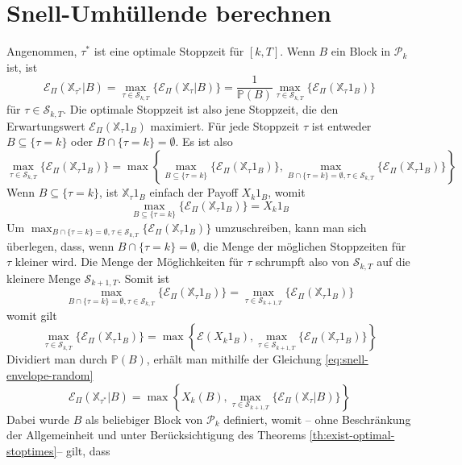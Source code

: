 \documentclass[11pt]{report} %
\begin{document}
\section{Snell-Umhüllende berechnen}
Angenommen, $\tau^*$ ist eine optimale Stoppzeit für $[k, T]$. Wenn $B$ ein Block in $\mathcal{P}_k$ ist, ist \begin{equation}\label{eq:snell-envelope-random}
    \mathcal{E}_\Pi(\mathbb{X}_{\tau^*}|B)=\max_{\tau\in\mathcal{S}_{k, T}}\{\mathcal{E}_\Pi(\mathbb{X}_\tau|B)\}=\frac{1}{\mathbb{P}(B)}\max_{\tau\in\mathcal{S}_{k, T}}\{\mathcal{E}_\Pi(\mathbb{X}_\tau1_B)\}
\end{equation} für $\tau\in\mathcal{S}_{k, T}$. Die optimale Stoppzeit ist also jene Stoppzeit, die den Erwartungswert $\mathcal{E}_\Pi(\mathbb{X}_\tau1_B)$ maximiert. Für jede Stoppzeit $\tau$ ist entweder $B\subseteq\{\tau=k\}$ oder $B\cap\{\tau=k\}=\emptyset$. Es ist also 
$$
\max_{\tau\in\mathcal{S}_{k, T}}\{\mathcal{E}_\Pi(\mathbb{X}_\tau 1_B)\} = \max \left\{ \max_{B\subseteq\{\tau = k\}} \{\mathcal{E}_\Pi(\mathbb{X}_\tau 1_B)\}, \max_{B \cap \{\tau = k\} = \emptyset, \tau \in \mathcal{S}_{k, T}} \{\mathcal{E}_\Pi(\mathbb{X}_\tau 1_B)\}\right\}
$$
Wenn $B\subseteq\{\tau=k\}$, ist $\mathbb{X}_\tau1_B$ einfach der Payoff $X_k1_B$, womit $$\max_{B\subseteq\{\tau=k\}}\{\mathcal{E}_\Pi(\mathbb{X}_\tau1_B)\}=X_k1_B$$
Um $\displaystyle \max_{B \cap \{\tau = k\} = \emptyset, \tau \in \mathcal{S}_{k, T}} \{\mathcal{E}_\Pi(\mathbb{X}_\tau 1_B)\}$ umzuschreiben, kann man sich überlegen, dass, wenn $B \cap \{\tau = k\} = \emptyset$, die Menge der möglichen Stoppzeiten für $\tau$ kleiner wird. Die Menge der Möglichkeiten für $\tau$ schrumpft also von $\mathcal{S}_{k, T}$ auf die kleinere Menge $\mathcal{S}_{k+1, T}$. Somit ist $$\max_{B \cap \{\tau = k\} = \emptyset, \tau \in \mathcal{S}_{k, T}} \{\mathcal{E}_\Pi(\mathbb{X}_\tau 1_B)\}=\max_{\tau\in\mathcal{S}_{k+1, T}}\{\mathcal{E}_\Pi(\mathbb{X}_\tau1_B)\}$$
womit gilt
$$\max_{\tau\in\mathcal{S}_{k, T}}\{\mathcal{E}_\Pi(\mathbb{X}_\tau 1_B)\}=\max\left\{\mathcal{E}(X_k1_B), \max_{\tau\in\mathcal{S}_{k+1, T}}\{\mathcal{E}_\Pi(\mathbb{X}_\tau1_B)\}\right\}$$
Dividiert man durch $\mathbb{P}(B)$, erhält man mithilfe der Gleichung \ref{eq:snell-envelope-random}
$$\mathcal{E}_\Pi(\mathbb{X}_{\tau^*}|B)=\max\left\{X_k(B), \max_{\tau\in\mathcal{S}_{k+1, T}}\{\mathcal{E}_\Pi(\mathbb{X}_\tau|B)\}\right\}$$
Dabei wurde $B$ als beliebiger Block von $\mathcal{P}_k$ definiert, womit -- ohne Beschränkung der Allgemeinheit und unter Berücksichtigung des Theorems \ref{th:exist-optimal-stoptimes}-- gilt, dass
\end{document}
